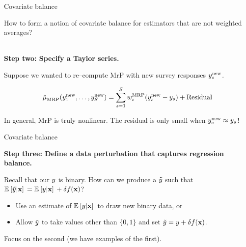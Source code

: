 
\begin{frame}[t]{Covariate balance}


How to form a notion of covariate balance for estimators that are not weighted averages?


\vspace{1em}
\hrulefill\\
\textbf{Step two: Specify a Taylor series.}

\def\new{\mathrm{new}}
Suppose we wanted to re--compute MrP with new
survey responses $\y_s^{\new}$.

$$
\muhat_{\mrp}(\y_1^\new, \ldots, \y_{\nsur}^\new) =
\sumsur \w_s^\mrp (\y_s^\new  - \y_s) + \mathrm{Residual}
$$

In general, MrP is truly nonlinear. The residual is only small when $\y_s^\new \approx \y_s$!


\end{frame}



\begin{frame}[t]{Covariate balance}


\textbf{Step three: Define a data perturbation that captures regression balance.}

Recall that our $y$ is binary.  How can we produce a $\tilde{y}$ such that
$\mathbb{E}_{}\left[ \tilde{y} \vert \mathbf{x}\right]\, = \mathbb{E}_{}\left[ y \vert \mathbf{x}\right]\, + \delta f(\mathbf{x})$?
%
\begin{itemize}
    \item Use an estimate of $\mathbb{E}_{}\left[ y \vert \mathbf{x}\right]\,$ to draw new binary data, or
    \item Allow $\tilde{y}$ to take values other than $\{0,1\}$ and set
        $\tilde{y} = y + \delta f(\mathbf{x})$.
\end{itemize}
%
Focus on the second (we have examples of the first).

\end{frame}




